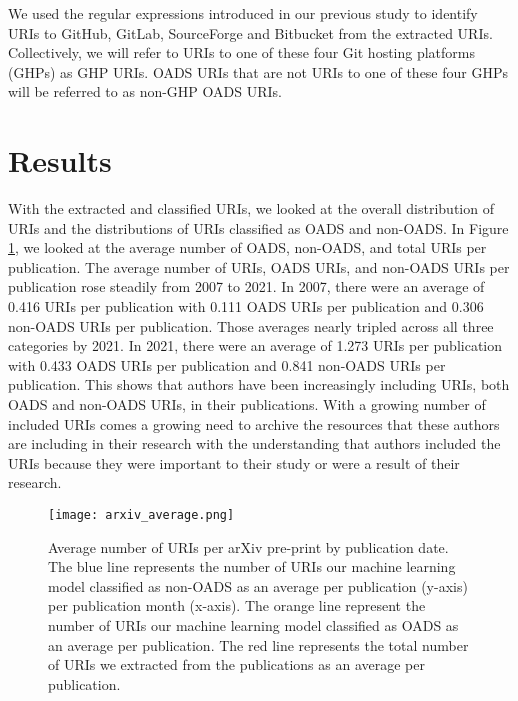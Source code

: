 We used the regular expressions introduced in our previous study \cite{escamilla-tpdl2022} to identify URIs to GitHub, GitLab, SourceForge and Bitbucket from the extracted URIs. Collectively, we will refer to URIs to one of these four Git hosting platforms (GHPs) as GHP URIs. OADS URIs that are not URIs to one of these four GHPs will be referred to as non-GHP OADS URIs. 

\section{Results}
With the extracted and classified URIs, we looked at the overall distribution of URIs and the distributions of URIs classified as OADS and non-OADS. In Figure \ref{fig:arxiv_average}, we looked at the average number of OADS, non-OADS, and total URIs per publication. The average number of URIs, OADS URIs, and non-OADS URIs per publication rose steadily from 2007 to 2021. In 2007, there were an average of 0.416 URIs per publication with 0.111 OADS URIs per publication and 0.306 non-OADS URIs per publication. Those averages nearly tripled across all three categories by 2021. In 2021, there were an average of 1.273 URIs per publication with 0.433 OADS URIs per publication and 0.841 non-OADS URIs per publication. This shows that authors have been increasingly including URIs, both OADS and non-OADS URIs, in their publications. With a growing number of included URIs comes a growing need to archive the resources that these authors are including in their research with the understanding that authors included the URIs because they were important to their study or were a result of their research.

\begin{figure}
    \centering
    \texttt{[image: arxiv\_average.png]}
    \caption{Average number of URIs per arXiv pre-print by publication date. The blue line represents the number of URIs our machine learning model classified as non-OADS as an average per publication (y-axis) per publication month (x-axis). The orange line represent the number of URIs our machine learning model classified as OADS as an average per publication. The red line represents the total number of URIs we extracted from the publications as an average per publication.}
    \label{fig:arxiv_average}
\end{figure}

